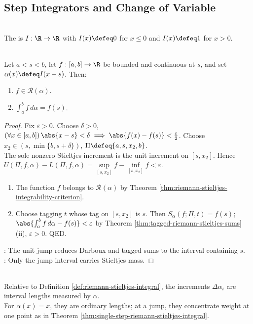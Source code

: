 \subsection{Step Integrators and Change of Variable}

\begin{definition} \label{def:unit-step-function-analysis} \\
The  is $I:\R\to\R$ with $I(x)\defeq0$ for $x\leq0$ and $I(x)\defeq1$ for $x>0$.
\end{definition}

\begin{theorem} \label{thm:single-step-riemann-stieltjes-integral} \\
Let $a<s<b$, let $f:[a,b]\to\R$ be bounded and continuous at $s$, and set $\alpha(x)\defeq I(x-s)$. Then:
\begin{enumerate}[label=(\roman*)]
\setlength{\itemsep}{0pt}
\item $f\in\mathcal{R}(\alpha)$.
\item $\int_a^b f\,d\alpha=f(s)$.
\end{enumerate}
\begin{proof}
Fix $\varepsilon>0$. Choose $\delta>0$, $(\forall x\in[a,b])\,\abs{x-s}<\delta\implies\abs{f(x)-f(s)}<\frac{\varepsilon}{2}$. Choose $x_2\in(s,\min\{b,s+\delta\})$, $\Pi\defeq\{a,s,x_2,b\}$.\\
The sole nonzero Stieltjes increment is the unit increment on $[s,x_2]$. Hence $U(\Pi,f,\alpha)-L(\Pi,f,\alpha)=\sup\limits_{[s,x_2]}f-\inf\limits_{[s,x_2]}f<\varepsilon$.
\begin{enumerate}[label=(\roman*)]
\setlength{\itemsep}{0pt}
\item The function $f$ belongs to $\mathcal{R}(\alpha)$ by Theorem \ref{thm:riemann-stieltjes-integrability-criterion}.
\item Choose tagging $t$ whose tag on $[s,x_2]$ is $s$. Then $S_\alpha(f;\Pi,t)=f(s)$; $\abs{\int_a^b f\,d\alpha-f(s)}<\varepsilon$ by Theorem \ref{thm:tagged-riemann-stieltjes-sums}(ii), $\varepsilon>0$. QED.
\end{enumerate}
: The unit jump reduces Darboux and tagged sums to the interval containing $s$.\\
: Only the jump interval carries Stieltjes mass.
\end{proof}
\end{theorem}

\begin{remark} \label{rem:stieltjes-increments-as-alpha-lengths} \\
Relative to Definition \ref{def:riemann-stieltjes-integral}, the increments $\Delta\alpha_i$ are interval lengths measured by $\alpha$.\\
For $\alpha(x)=x$, they are ordinary lengths; at a jump, they concentrate weight at one point as in Theorem \ref{thm:single-step-riemann-stieltjes-integral}.
\end{remark}

